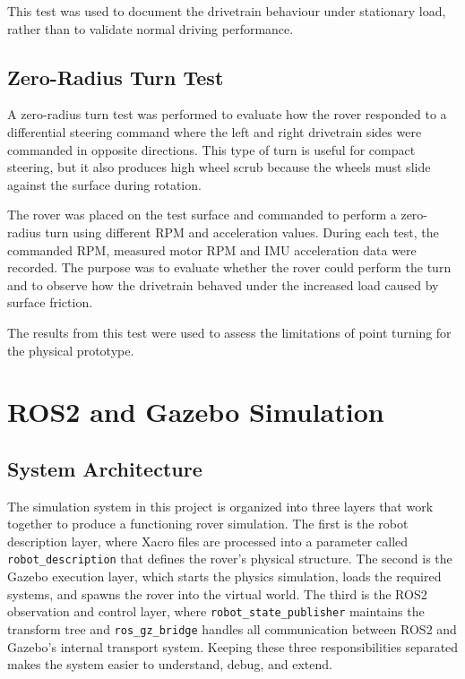 This test was used to document the drivetrain behaviour under stationary load, rather than to validate normal driving performance.

\subsection{Zero-Radius Turn Test}
A zero-radius turn test was performed to evaluate how the rover responded to a differential steering command where the left and right drivetrain sides were commanded in opposite directions. This type of turn is useful for compact steering, but it also produces high wheel scrub because the wheels must slide against the surface during rotation.

The rover was placed on the test surface and commanded to perform a zero-radius turn using different RPM and acceleration values. During each test, the commanded RPM, measured motor RPM and IMU acceleration data were recorded. The purpose was to evaluate whether the rover could perform the turn and to observe how the drivetrain behaved under the increased load caused by surface friction.

The results from this test were used to assess the limitations of point turning for the physical prototype.
\newpage

\section{ROS2 and Gazebo Simulation}

\subsection{System Architecture}

The simulation system in this project is organized into three layers that work together to produce a functioning rover simulation. The first is the robot description layer, where Xacro files are processed into a parameter called \texttt{robot\_description} that defines the rover's physical structure. The second is the Gazebo execution layer, which starts the physics simulation, loads the required systems, and spawns the rover into the virtual world. The third is the ROS2 observation and control layer, where \texttt{robot\_state\_publisher} maintains the transform tree and \texttt{ros\_gz\_bridge} handles all communication between ROS2 and Gazebo's internal transport system. Keeping these three responsibilities separated makes the system easier to understand, debug, and extend.

